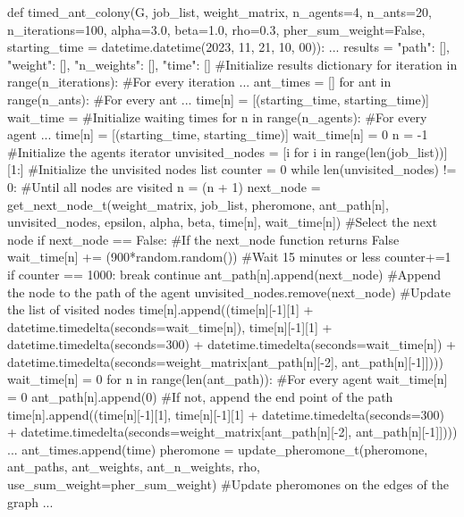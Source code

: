\documentclass[titlepage]{article}
\begin{document}
\begin{python}
def timed_ant_colony(G, job_list, weight_matrix, n_agents=4, n_ants=20, n_iterations=100, alpha=3.0, beta=1.0, rho=0.3, pher_sum_weight=False, starting_time = datetime.datetime(2023, 11, 21, 10, 00)):
    ...
    results = {"path": [], "weight": [], "n_weights": [], "time": []} #Initialize results dictionary
    for iteration in range(n_iterations): #For every iteration
        ...
        ant_times = []
        for ant in range(n_ants): #For every ant
            ...
            time[n] = [(starting_time, starting_time)]
            wait_time = {} #Initialize waiting times
            for n in range(n_agents): #For every agent
                ...
                time[n] = [(starting_time, starting_time)]
                wait_time[n] = 0
            n = -1 #Initialize the agents iterator
            unvisited_nodes = [i for i in range(len(job_list))][1:] #Initialize the unvisited nodes list
            counter = 0
            while len(unvisited_nodes) != 0: #Until all nodes are visited
                n = (n + 1) %
                next_node = get_next_node_t(weight_matrix, job_list, pheromone, ant_path[n], unvisited_nodes, epsilon, alpha, beta, time[n], wait_time[n]) #Select the next node
                if next_node == False: #If the next_node function returns False
                    wait_time[n] += (900*random.random()) #Wait 15 minutes or less
                    counter+=1
                    if counter == 1000:
                        break
                    continue
                ant_path[n].append(next_node) #Append the node to the path of the agent
                unvisited_nodes.remove(next_node) #Update the list of visited nodes
                time[n].append((time[n][-1][1] + datetime.timedelta(seconds=wait_time[n]), time[n][-1][1] + datetime.timedelta(seconds=300) + datetime.timedelta(seconds=wait_time[n]) + datetime.timedelta(seconds=weight_matrix[ant_path[n][-2], ant_path[n][-1]])))
                wait_time[n] = 0
            for n in range(len(ant_path)): #For every agent
                    wait_time[n] = 0
                    ant_path[n].append(0) #If not, append the end point of the path
                    time[n].append((time[n][-1][1], time[n][-1][1] + datetime.timedelta(seconds=300) + datetime.timedelta(seconds=weight_matrix[ant_path[n][-2], ant_path[n][-1]])))
            ...
            ant_times.append(time)
        pheromone = update_pheromone_t(pheromone, ant_paths, ant_weights, ant_n_weights, rho, use_sum_weight=pher_sum_weight) #Update pheromones on the edges of the graph
        ...
\end{python}
\end{document}
